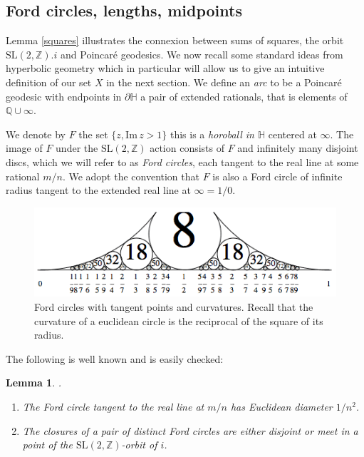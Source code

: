 \documentclass[12pt,a4paper]{amsart}
\newtheorem{lem}[thm]{Lemma}
\def\im{\mathrm{Im}\,}
\def\ZZ{\mathbb{Z}}
\def\sl2{\mathrm{SL}(2, \ZZ)}
\begin{document}
\subsection{Ford circles, lengths, midpoints} 
\label{lengths}
Lemma \ref{squares} illustrates the connexion between sums of squares,
the orbit $\sl2.i$ and Poincaré geodesics. 
We now recall some standard ideas from hyperbolic geometry
which in particular will allow us to give an intuitive definition 
of our set $X$ in the next section.
We define an \textit{arc} to be a Poincaré geodesic
with endpoints in $\partial \mathbb{H}$ a pair of extended rationals, 
that is elements of $\mathbb{Q} \cup \infty$.

We denote by $F$ the set  $\{ z, \im z > 1\}$
this is a \textit{horoball in $\mathbb{H}$} centered at $\infty$.
The image of $F$ under the $\sl2$ action consists of
$F$ and infinitely many disjoint discs, 
which we will refer to as \textit{Ford circles}, 
each tangent to the real line at some rational $m/n$.
We adopt the convention that $F$ is also a Ford circle of infinite radius
tangent to the extended real line at $\infty = 1/0$.


\begin{figure}[ht]

	\begin{center} \includegraphics[scale=.8]{Ford-circles.png}
	\end{center}

\caption{Ford circles with tangent points and curvatures. Recall
that the curvature of a euclidean circle is the reciprocal of the
square of its radius.}%
\end{figure}


The following is well known and is easily checked:

\begin{lem}\label{ford}.

\begin{enumerate}
\item The Ford circle tangent to the real line at $m/n$
has Euclidean diameter $1/n^2$.

\item The closures of a  pair of distinct Ford circles are either disjoint or meet in a 
point of the $\sl2$-orbit of $i$.
\end{enumerate}
\end{lem}
\end{document}
